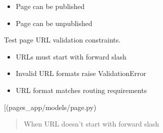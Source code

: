 \documentclass[letterpaper,10pt,english]{sphinxmanual}
\begin{document}
\begin{fulllineitems}
\begin{fulllineitems}
\begin{description}
\begin{itemize}
\item {} 
\sphinxAtStartPar
Page can be published

\item {} 
\sphinxAtStartPar
Page can be unpublished

\end{itemize}

\end{description}

\end{fulllineitems}


\begin{fulllineitems}
\label{\detokenize{pages_app.tests:pages_app.tests.test_models.PageModelTest.test_page_url_validation}}
\pysigstartsignatures
\pysiglinewithargsret
{}
{}
{}
\pysigstopsignatures
\sphinxAtStartPar
Test page URL validation constraints.
\begin{description}
\begin{itemize}
\item {} 
\sphinxAtStartPar
URLs must start with forward slash

\item {} 
\sphinxAtStartPar
Invalid URL formats raise ValidationError

\item {} 
\sphinxAtStartPar
URL format matches routing requirements

\end{itemize}

\sphinxAtStartPar
{[}\sphinxtitleref{Page}{]}(pages\_app/models/page.py)

\end{description}
\begin{quote}\begin{description}
\sphinxAtStartPar
{} \textendash{} When URL doesn’t start with forward slash

\end{description}\end{quote}

\end{fulllineitems}


\end{fulllineitems}
\end{document}

